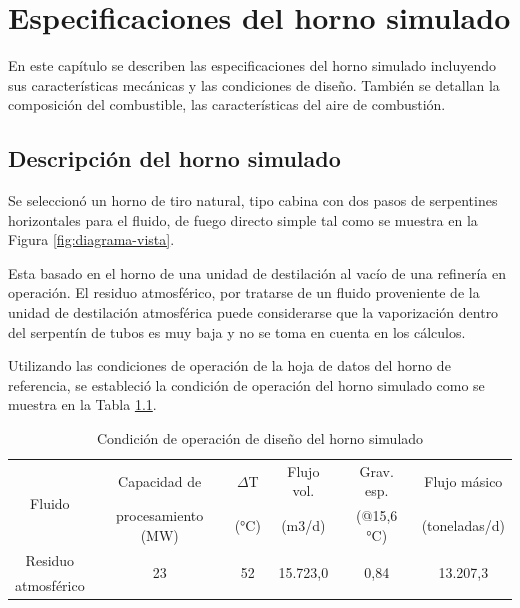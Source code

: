 \chapter{Especificaciones del horno simulado}
\par En este capítulo se describen las especificaciones del horno simulado incluyendo sus características mecánicas y las condiciones de diseño. También se detallan la composición del combustible, las características del aire de combustión.

\section{Descripción del horno simulado}
\par Se seleccionó un horno de tiro natural, tipo cabina con dos pasos de serpentines horizontales para el fluido, de fuego directo simple tal como se muestra en la Figura \ref{fig:diagrama-vista}.
\par Esta basado en el horno de una unidad de destilación al vacío de una refinería en operación. El residuo atmosférico, por tratarse de un fluido proveniente de la unidad de destilación atmosférica puede considerarse que la vaporización dentro del serpentín de tubos es muy baja y no se toma en cuenta en los cálculos.
\par Utilizando las condiciones de operación de la hoja de datos del horno de referencia, se estableció la condición de operación del horno simulado como se muestra en la Tabla \ref{tbl:capacidad}.
\begin{table}[H] \centering
\caption[Condición de operación de diseño del horno]
{Condición de operación de diseño del horno simulado}
\label{tbl:capacidad}\begin{tabular}{c|c|c|c|c|c}
\multirow{2}{*}{Fluido} & Capacidad de &
                    $\Delta$T   & Flujo vol. & Grav. esp. & Flujo másico\\
& procesamiento (MW) & (°C)     & (m3/d)     & (@15,6 °C) & (toneladas/d)\\
\hline
Residuo & \multirow{2}{*}{23} & \multirow{2}{*}{52} & 
\multirow{2}{*}{15.723,0} & \multirow{2}{*}{0,84} & \multirow{2}{*}{13.207,3} \\
atmosférico &&&&
\end{tabular}\end{table}
